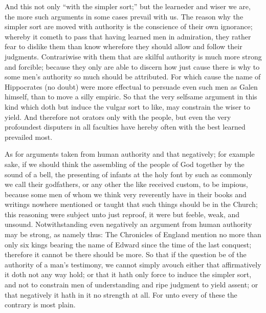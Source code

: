 And this not only “with the simpler sort;” but the learneder and wiser we are, the more such arguments in some cases prevail with us. The reason why the simpler sort are moved with authority is the conscience of their own ignorance; whereby it cometh to pass that having learned men in admiration, they rather fear to dislike them than know wherefore they should allow and follow their judgments. Contrariwise with them that are skilful authority is much more strong and forcible; because they only are able to discern how just cause there is why to some men’s authority so much should be attributed. For which cause the name of Hippocrates (no doubt) were more effectual to persuade even such men as Galen himself, than to move a silly empiric. So that the very selfsame argument in this kind which doth but induce the vulgar sort to like, may constrain the wiser to yield. And therefore not orators only with the people, but even the very  profoundest disputers in all faculties have hereby often with the best learned prevailed most.

As for arguments taken from human authority and that negatively; for example sake, if we should think the assembling of the people of God together by the sound of a bell, the presenting of infants at the holy font by such as commonly we call their godfathers, or any other the like received custom, to be impious, because some men of whom we think very reverently have in their books and writings nowhere mentioned or taught that such things should be in the Church; this reasoning were subject unto just reproof, it were but feeble, weak, and unsound. Notwithstanding even negatively an argument from human authority may be strong, as namely thus: The Chronicles of England mention no more than only six kings bearing the name of Edward since the time of the last conquest; therefore it cannot be there should be more. So that if the question be of the authority of a man’s testimony, we cannot simply avouch either that affirmatively it doth not any way hold; or that it hath only force to induce the simpler sort, and not to constrain men of understanding and ripe judgment to yield assent; or that negatively it hath in it no strength at all. For unto every of these the contrary is most plain.

